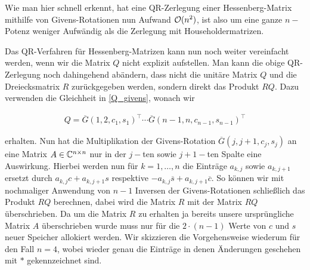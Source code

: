 \documentclass{article}
\theoremstyle{plain}
\begin{document}
Wie man hier schnell erkennt, hat eine QR-Zerlegung einer Hessenberg-Matrix mithilfe von Givens-Rotationen nun Aufwand $\mathcal{O}(n^2)$, ist also um eine ganze $n-$Potenz weniger Aufwändig als die Zerlegung mit Householdermatrizen.

Das QR-Verfahren für Hessenberg-Matrizen kann nun noch weiter vereinfacht werden, wenn wir die Matrix $Q$ nicht explizit aufstellen. Man kann die obige QR-Zerlegung noch dahingehend abändern, dass nicht die unitäre Matrix $Q$ und die Dreiecksmatrix $R$ zurückgegeben werden, sondern direkt das Produkt $RQ$. Dazu verwenden die Gleichheit in \eqref{Q_givens}, wonach wir

\begin{align*}
	Q = \overline{G}(1,2,c_1,s_1)^\top\cdots\overline{G}(n-1,n,c_{n-1},s_{n-1})^\top
\end{align*}

erhalten. Nun hat die Multiplikation der Givens-Rotation $\overline{G}(j,j+1, c_j, s_j)$ an eine Matrix $A \in \mathbb{C}^{n\times n}$ nur in der $j-$ten sowie $j+1-$ten Spalte eine Auswirkung. Hierbei werden nun für $k = 1,\dots,n$ die Einträge $a_{k,j}$ sowie $a_{k,j+1}$ ersetzt durch $a_{k,j}c + a_{k,j+1}s$ respektive $-a_{k,j}\overline{s} + a_{k,j+1}\overline{c}$.
So können wir mit nochmaliger Anwendung von $n-1$ Inversen der Givens-Rotationen schließlich das Produkt $RQ$ berechnen, dabei wird die Matrix $R$ mit der Matrix $RQ$ überschrieben. Da um die Matrix $R$ zu erhalten ja bereits unsere ursprüngliche Matrix $A$ überschrieben wurde muss nur für die $2 \cdot (n-1)$ Werte von $c$ und $s$ neuer Speicher allokiert werden. Wir skizzieren die Vorgehensweise wiederum für den Fall $n=4$, wobei wieder genau die Einträge in denen Änderungen geschehen mit $*$ gekennzeichnet sind.
\end{document}
